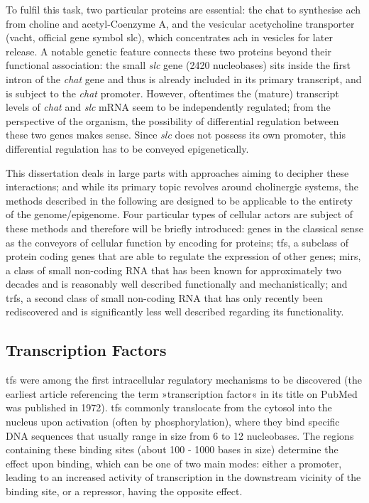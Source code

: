  To fulfil this task, two particular proteins are essential: the \ac{chat} to synthesise \ac{ach} from choline and acetyl-Coenzyme A, and the vesicular acetycholine transporter (\acs{vacht}, official gene symbol \acs{slc}), which concentrates \ac{ach} in vesicles for later release. A notable genetic feature connects these two proteins beyond their functional association: the small \textit{\ac{slc}} gene (2420 nucleobases) sits inside the first intron of the \textit{\ac{chat}} gene and thus is already included in its primary transcript, and is subject to the \textit{\ac{chat}} promoter. However, oftentimes the (mature) transcript levels of \textit{\ac{chat}} and \textit{\ac{slc}} mRNA seem to be independently regulated; from the perspective of the organism, the possibility of differential regulation between these two genes makes sense. Since \textit{\ac{slc}} does not possess its own promoter, this differential regulation has to be conveyed epigenetically. 

This dissertation deals in large parts with approaches aiming to decipher these interactions; and while its primary topic revolves around cholinergic systems, the methods described in the following are designed to be applicable to the entirety of the genome/epigenome. Four particular types of cellular actors are subject of these methods and therefore will be briefly introduced: genes in the classical sense as the conveyors of cellular function by encoding for proteins; \acp{tf}, a subclass of protein coding genes that are able to regulate the expression of other genes; \acp{mir}, a class of small non-coding RNA that has been known for approximately two decades and is reasonably well described functionally and mechanistically; and \acp{trf}, a second class of small non-coding RNA that has only recently been rediscovered and is significantly less well described regarding its functionality.

\subsection{Transcription Factors} \label{sec:intro:tf}
\Acp{tf} were among the first intracellular regulatory mechanisms to be discovered (the earliest article referencing the term »transcription factor« in its title on PubMed was published in 1972). \acp{tf} commonly translocate from the cytosol into the nucleus upon activation (often by phosphorylation), where they bind specific DNA sequences that usually range in size from 6 to 12 nucleobases. The regions containing these binding sites (about 100 - 1000 bases in size) determine the effect upon binding, which can be one of two main modes: either a promoter, leading to an increased activity of transcription in the downstream vicinity of the binding site, or a repressor, having the opposite effect. 

